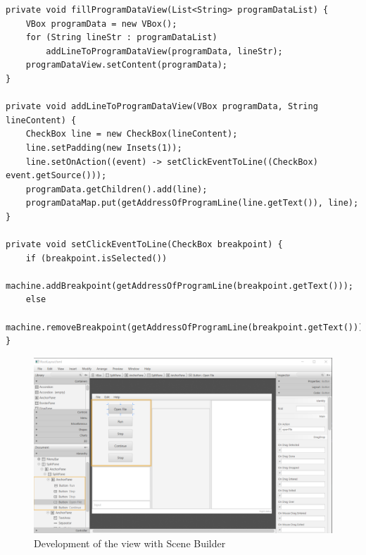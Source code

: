   
\begin{lstlisting}[caption={Implementation of program data view},label=listing:ProgramDataView]
private void fillProgramDataView(List<String> programDataList) {
    VBox programData = new VBox();
    for (String lineStr : programDataList)
        addLineToProgramDataView(programData, lineStr);
    programDataView.setContent(programData);
}

private void addLineToProgramDataView(VBox programData, String lineContent) {
    CheckBox line = new CheckBox(lineContent);
    line.setPadding(new Insets(1));
    line.setOnAction((event) -> setClickEventToLine((CheckBox) event.getSource()));
    programData.getChildren().add(line);
    programDataMap.put(getAddressOfProgramLine(line.getText()), line);
}

private void setClickEventToLine(CheckBox breakpoint) {
    if (breakpoint.isSelected())
        machine.addBreakpoint(getAddressOfProgramLine(breakpoint.getText()));
    else
        machine.removeBreakpoint(getAddressOfProgramLine(breakpoint.getText()));
}
\end{lstlisting}

\begin{figure}[h] 
	\centering
	\includegraphics[scale=.55]{images/view.png}
	\caption{Development of the view with Scene Builder}
	\label{fig:view}
\end{figure}
